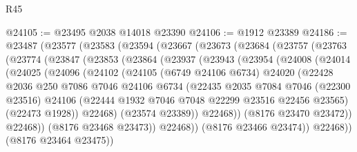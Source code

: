 \begin{lexlean}{R45}
\begin{coremodule}
{@24105 := @23495 @2038 @14018 @23390
@24106 := @1912 @23389
@24186 := @23487
    (@23577
      (@23583
        (@23594
          (@23667
            (@23673
              (@23684
                (@23757
                  (@23763
                    (@23774
                      (@23847
                        (@23853
                          (@23864
                            (@23937
                              (@23943
                                (@23954
                                  (@24008
                                    (@24014
                                      (@24025
                                        (@24096
                                          (@24102
                                            (@24105
                                              (@6749 @24106 @6734)
                                              @24020
                                              (@22428
                                                @2036
                                                @250
                                                @7086
                                                @7046
                                                @24106
                                                @6734
                                                (@22435
                                                  @2035
                                                  @7084
                                                  @7046
                                                  (@22300 @23516)
                                                  @24106
                                                  (@22444
                                                    @1932
                                                    @7046
                                                    @7048
                                                    @22299
                                                    @23516
                                                    @22456
                                                    @23565)
                                                  (@22473 @1928))
                                                @22468)
                                              (@23574 @23389))
                                            @22468))
                                        (@8176 @23470 @23472))
                                      @22468))
                                  (@8176 @23468 @23473))
                                @22468))
                            (@8176 @23466 @23474))
                          @22468))
                      (@8176 @23464 @23475))
}
\end{coremodule}
\end{lexlean}
